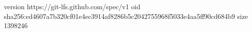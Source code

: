 version https://git-lfs.github.com/spec/v1
oid sha256:ed4607a7b320cf01e4ec3914af8286b5c2042755968f5033e4aa5ff90cd684b9
size 1398246
